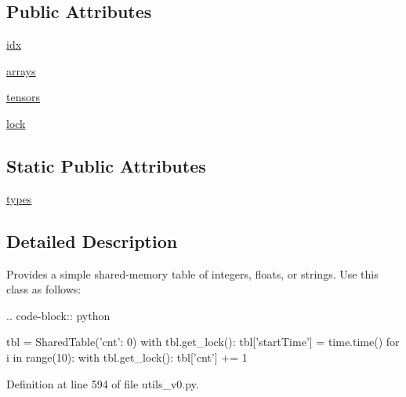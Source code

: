 \subsection*{Public Attributes}
\begin{DoxyCompactItemize}
\item 
\hyperlink{classparlai_1_1agents_1_1legacy__agents_1_1seq2seq_1_1utils__v0_1_1SharedTable_ae28772f48b62430475ee87a0e0165297}{idx}
\item 
\hyperlink{classparlai_1_1agents_1_1legacy__agents_1_1seq2seq_1_1utils__v0_1_1SharedTable_a85e95ce5ffe060084b0aac12e09eb04d}{arrays}
\item 
\hyperlink{classparlai_1_1agents_1_1legacy__agents_1_1seq2seq_1_1utils__v0_1_1SharedTable_a10fd3cbec22c17f5e522d7813f3d3056}{tensors}
\item 
\hyperlink{classparlai_1_1agents_1_1legacy__agents_1_1seq2seq_1_1utils__v0_1_1SharedTable_acd92e05b572beb74c384c3c6b833dac6}{lock}
\end{DoxyCompactItemize}
\subsection*{Static Public Attributes}
\begin{DoxyCompactItemize}
\item 
\hyperlink{classparlai_1_1agents_1_1legacy__agents_1_1seq2seq_1_1utils__v0_1_1SharedTable_a4f70d8a63684f7adb80f1efcb64c876d}{types}
\end{DoxyCompactItemize}


\subsection{Detailed Description}
\begin{DoxyVerb}Provides a simple shared-memory table of integers, floats, or strings. Use this
class as follows:

.. code-block:: python

    tbl = SharedTable({'cnt': 0})
    with tbl.get_lock():
        tbl['startTime'] = time.time()
    for i in range(10):
        with tbl.get_lock():
            tbl['cnt'] += 1
\end{DoxyVerb}
 

Definition at line 594 of file utils\+\_\+v0.\+py.



